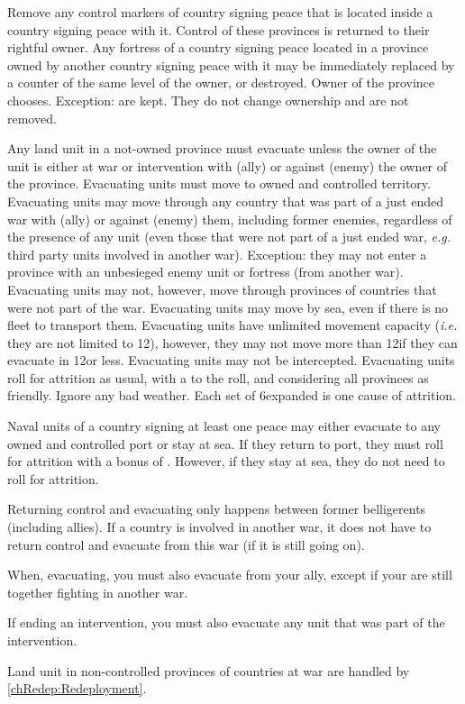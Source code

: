  Remove any control markers of country signing peace
that is located inside a country signing peace with it. Control of these
provinces is returned to their rightful owner.
\bparag Any fortress of a country signing peace located in a province owned by
another country signing peace with it may be immediately replaced by a counter
of the same level of the owner, or destroyed. Owner of the province chooses.
\bparag Exception: \Presidios are kept. They do not change ownership and are
not removed.

\label{chPeace:Evacuation}
Any land unit in a not-owned province must evacuate unless the owner of the
unit is either at war or intervention with (ally) or against (enemy) the owner
of the province.
\bparag Evacuating units must move to owned and controlled territory.
\bparag Evacuating units may move through any country that was part of a just
ended war with (ally) or against (enemy) them, including former enemies,
regardless of the presence of any unit (even those that were not part of a
just ended war, \emph{e.g.} third party units involved in another war).
\bparag Exception: they may not enter a province with an unbesieged enemy unit
or fortress (from another war).
\bparag Evacuating units may not, however, move through provinces of countries
that were not part of the war.
\bparag Evacuating units may move by sea, even if there is no fleet to
transport them.
\bparag Evacuating units have unlimited movement capacity (\emph{i.e.} they
are not limited to 12\MP), however, they may not move more than 12\MP if they
can evacuate in 12\MP or less.
\bparag Evacuating units may not be intercepted.
\bparag Evacuating units roll for attrition as usual, with a  to the
roll, and considering all provinces as friendly. Ignore any bad weather. Each
set of 6\MP expanded is one cause of attrition.

 Naval units of a country signing at least one peace
may either evacuate to any owned and controlled port or stay at sea.
\bparag If they return to port, they must roll for attrition with a bonus of
.
\bparag However, if they stay at sea, they do not need to roll for attrition.

\begin{designnote}
  Returning control and evacuating only happens between former belligerents
  (including allies). If a country is involved in another war, it does not
  have to return control and evacuate from this war (if it is still going
  on).

  When, evacuating, you must also evacuate from your ally, except if your are
  still together fighting in another war.
  
  If ending an intervention, you must also evacuate any unit that was part of
  the intervention.

  Land unit in non-controlled provinces of countries at war are handled by
  \ref{chRedep:Redeployment}.
\end{designnote}

